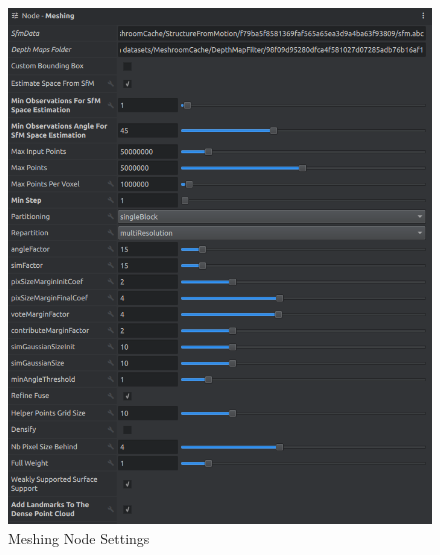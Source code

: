 \documentclass[12pt]{report}
\begin{document}
\begin{figure}[H]%
  \centering
  \includegraphics[width=1\textwidth]{meshing_1.png}
\caption{Meshing Node Settings}
\label{fig:meshing1_big}
\end{figure}
\end{document}
